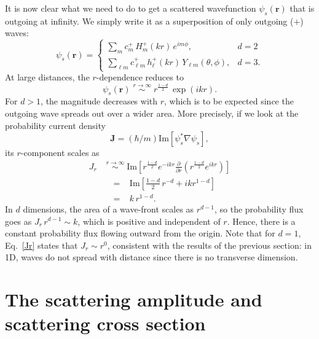 \documentclass[pra,12pt]{revtex4}
\begin{document}
It is now clear what we need to do to get a scattered wavefunction
$\psi_s(\mathbf{r})$ that is outgoing at infinity.  We simply write it
as a superposition of only outgoing ($+$) waves:
\begin{equation}
  \psi_s(\mathbf{r}) = \begin{cases} \displaystyle\sum_{m} c_m^+\,H_m^+(kr)\,e^{im\phi}, &d=2\\ \displaystyle\sum_{\ell m} c_{\ell m}^+\,h_\ell^+(kr)\,Y_{\ell m}(\theta,\phi),&d=3.\end{cases}
\end{equation}
At large distances, the $r$-dependence reduces to
\begin{equation}
  \psi_s(\mathbf{r}) \; \overset{r\rightarrow\infty}{\sim} \; r^{\frac{1-d}{2}} \,\exp\left(ikr\right).
\end{equation}
For $d > 1$, the magnitude decreases with $r$, which is to be expected
since the outgoing wave spreads out over a wider area.  More
precisely, if we look at the probability current density
\begin{equation*}
  \mathbf{J} = (\hbar/m) \mathrm{Im}\left[\psi_s^*\nabla\psi_s\right],  
\end{equation*}
its $r$-component scales as
\begin{equation}
  \begin{aligned}J_r \; &\overset{r\rightarrow\infty}{\sim} \; \mathrm{Im}\left[r^{\frac{1-d}{2}} e^{-ikr} \frac{\partial}{\partial r}\left(r^{\frac{1-d}{2}} e^{ikr}\right)\right] \\ &\;\;=\;\;\;\mathrm{Im}\left[\frac{1-d}{2}\, r^{-d} + ik r^{1-d}\right]\\ &\;\;=\;\;\; k \,r^{1-d}.\end{aligned}
  \label{Jr}
\end{equation}
In $d$ dimensions, the area of a wave-front scales as $r^{d-1}$, so
the probability flux goes as $J_r \,r^{d-1} \sim k$, which is positive
and independent of $r$.  Hence, there is a constant probability flux
flowing outward from the origin.  Note that for $d=1$, Eq.~\eqref{Jr}
states that $J_r \sim r^0$, consistent with the results of the
previous section: in 1D, waves do not spread with distance since there
is no transverse dimension.

\section{The scattering amplitude and scattering cross section}
\label{sec:scattering_amplitude}
\end{document}
